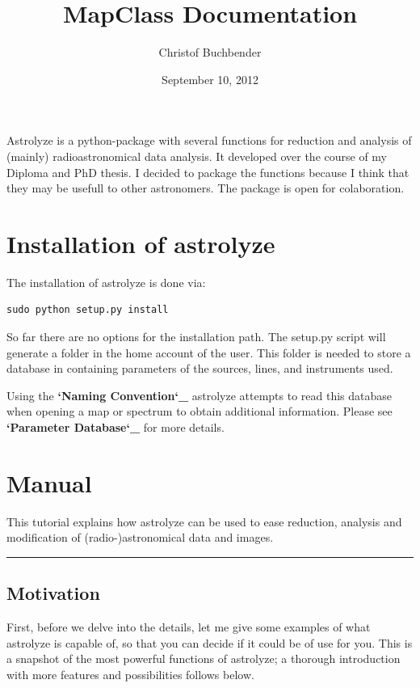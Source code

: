 \documentclass[a4paper,10pt,english]{sphinxmanual}
\title{MapClass Documentation}
\date{September 10, 2012}
\author{Christof Buchbender}
\begin{document}
\maketitle
\tableofcontents
{}\label{index::doc}


Astrolyze is a python-package with several functions for reduction and analysis
of (mainly) radioastronomical data analysis. It developed over the course of
my Diploma and PhD thesis. I decided to package the functions because I think
that they may be usefull to other astronomers. The package is open for
colaboration.


\chapter{Installation of astrolyze}
\label{installation::doc}\label{installation:astrolyze-documentation}\label{installation:installation-of-astrolyze}
The installation of astrolyze is done via:

\begin{Verbatim}[commandchars=\\\{\}]
sudo python setup.py install
\end{Verbatim}

So far there are no options for the installation path. The setup.py script will
generate a  folder in the home account of the user.  This
folder is needed to store a database in 
containing parameters of the sources, lines, and instruments used.

Using the {\color{red}\bfseries{}{}`Naming Convention{}`\_} astrolyze attempts to read this database when
opening a map or spectrum to obtain additional information. Please see
{\color{red}\bfseries{}{}`Parameter Database{}`\_} for more details.


\chapter{Manual}
\label{manual:manual}\label{manual::doc}
This tutorial explains how astrolyze can be used to ease reduction,
analysis and modification of (radio-)astronomical data and images.


\bigskip\hrule{}\bigskip



\section{Motivation}
\label{manual:motivation}
First, before we delve into the details, let me give some examples of what
astrolyze is capable of, so that you can decide if it could be of use for you.
This is a snapshot of the most powerful functions of astrolyze; a thorough
introduction with more features and possibilities follows below.
\end{document}
